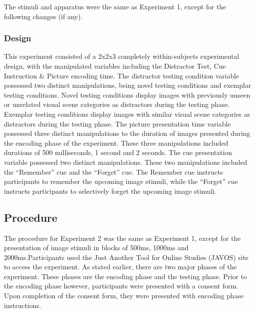 \documentclass[
  english,
  man,floatsintext]{apa6}
\begin{document}
The stimuli and apparatus were the same as Experiment 1, except for the following changes (if any).

\hypertarget{design-1}{%
\subsubsection{Design}\label{design-1}}

This experiment consisted of a 2x2x3 completely within-subjects experimental design, with the manipulated variables including the Distractor Test, Cue Instruction \& Picture encoding time. The distractor testing condition variable possessed two distinct manipulations, being novel testing conditions and exemplar testing conditions. Novel testing conditions display images with previously unseen or unrelated visual scene categories as distractors during the testing phase. Exemplar testing conditions display images with similar visual scene categories as distractors during the testing phase. The picture presentation time variable possessed three distinct manipulations to the duration of images presented during the encoding phase of the experiment. These three manipulations included durations of 500 milliseconds, 1 second and 2 seconds. The cue presentation variable possessed two distinct manipulations. These two manipulations included the \enquote{Remember} cue and the \enquote{Forget} cue. The Remember cue instructs participants to remember the upcoming image stimuli, while the \enquote{Forget} cue instructs participants to selectively forget the upcoming image stimuli.

\hypertarget{procedure-1}{%
\subsection{Procedure}\label{procedure-1}}

The procedure for Experiment 2 was the same as Experiment 1, except for the presentation of image stimuli in blocks of 500ms, 1000ms and 2000ms.Participants used the Just Another Tool for Online Studies (JAVOS) site to access the experiment. As stated earlier, there are two major phases of the experiment. These phases are the encoding phase and the testing phase. Prior to the encoding phase however, participants were presented with a consent form. Upon completion of the consent form, they were presented with encoding phase instructions.
\end{document}
